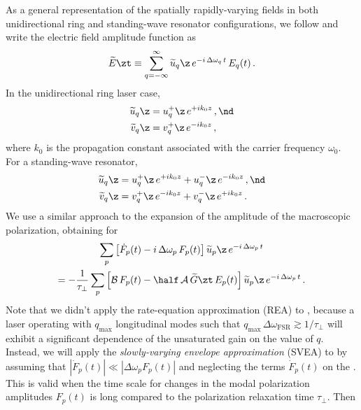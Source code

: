 As a general representation of the spatially rapidly-varying fields in both unidirectional ring and standing-wave resonator configurations, we follow  and write the electric field amplitude function as
\begin{equation}
  \label{eqn:mml_e_1d_zt_rv}
  \widetilde{E}\zt \equiv \sum_{q = -\infty}^\infty \widetilde{u}_q\z\, e^{-i\, \Delta \omega_q\, t}\, E_q(t)\, .
\end{equation}
In the unidirectional ring laser case,
\begin{subequations}
  \label{eqn:mml_1d_uvq_url}
  \begin{align}
    \label{eqn:mml_1d_uq_url} \widetilde{u}_q\z &= u^{+}_q\z\, e^{+i k_0 z}\, , \nd \\
    \label{eqn:mml_1d_vq_url} \widetilde{v}_q\z &= v^{+}_q\z\, e^{-i k_0 z}\, ,
  \end{align}
\end{subequations}
where $k_0$ is the propagation constant associated with the carrier frequency $\omega_0$. For a standing-wave resonator,
\begin{subequations}
  \label{eqn:mml_1d_uvq_swl}
  \begin{align}
    \label{eqn:mml_1d_uq_swl} \widetilde{u}_q\z &= u^{+}_q\z\, e^{+i k_0 z} + u^{-}_q\z\, e^{-i k_0 z}\, , \nd \\
    \label{eqn:mml_1d_vq_swl} \widetilde{v}_q\z &= v^{+}_q\z\, e^{-i k_0 z} + v^{-}_q\z\, e^{+i k_0 z}\, .
  \end{align}
\end{subequations}
We use a similar approach to the expansion of the amplitude of the macroscopic polarization, obtaining for 
\begin{multline} \label{eqn:mml_ftz_expansion}
  \sum_p \left[ \dot{F}_p(t) - i\, \Delta \omega_p\, F_p(t) \right] \widetilde{u}_p\z\, e^{-i\, \Delta \omega_p\, t} \\
  = -\frac{1}{\tau_\perp} \sum_p \left[ \mathcal{B}\, F_p(t) - \half\, \mathcal{A}\, \widetilde{G}\zt\, E_p(t) \right] \widetilde{u}_p\z\, e^{-i\, \Delta \omega_p\, t}\, .
\end{multline}
Note that we didn't apply the rate-equation approximation (REA) to , because a laser operating with $q_\text{max}$ longitudinal modes such that $q_\text{max}\, \Delta \omega_\text{FSR} \gtrsim 1 / \tau_\perp$ will exhibit a significant dependence of the unsaturated gain on the value of $q$. Instead, we will apply the \emph{slowly-varying envelope approximation} (SVEA) to  by assuming that $|\dot{F}_p(t)| \ll |\Delta \omega_p F_p(t)|$ and neglecting the terms $\dot{F}_p(t)$ on the \lhs. This is valid when the time scale for changes in the modal polarization amplitudes $F_p(t)$ is long compared to the polarization relaxation time $\tau_\perp$. Then
